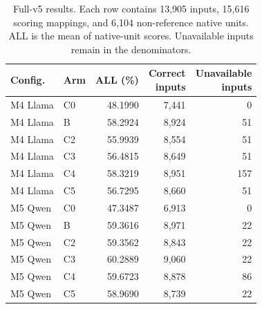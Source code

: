 \begin{table}[htbp]
\centering
\small
\caption{Full-v5 results. Each row contains 13,905 inputs, 15,616 scoring mappings, and 6,104
non-reference native units. ALL is the mean of native-unit scores. Unavailable inputs
remain in the denominators.}
\label{tab:main_results}
\setlength{\tabcolsep}{5pt}
\begin{tabular}{@{}llrrr@{}}
\toprule
Config. & Arm & ALL (\%) & \shortstack{Correct\\inputs} & \shortstack{Unavailable\\inputs} \\
\midrule
M4 Llama & C0 & 48.1990 & 7,441 & 0 \\
M4 Llama & B & 58.2924 & 8,924 & 51 \\
M4 Llama & C2 & 55.9939 & 8,554 & 51 \\
M4 Llama & C3 & 56.4815 & 8,649 & 51 \\
M4 Llama & C4 & 58.3219 & 8,951 & 157 \\
M4 Llama & C5 & 56.7295 & 8,660 & 51 \\
\addlinespace
M5 Qwen & C0 & 47.3487 & 6,913 & 0 \\
M5 Qwen & B & 59.3616 & 8,971 & 22 \\
M5 Qwen & C2 & 59.3562 & 8,843 & 22 \\
M5 Qwen & C3 & 60.2889 & 9,060 & 22 \\
M5 Qwen & C4 & 59.6723 & 8,878 & 86 \\
M5 Qwen & C5 & 58.9690 & 8,739 & 22 \\
\bottomrule
\end{tabular}
\end{table}
